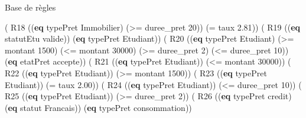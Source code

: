 \documentclass[
  ignorenonframetext,
]{beamer}
\newenvironment{Shaded}{}{}
\newcommand{\DecValTok}[1]{\textcolor[rgb]{0.25,0.63,0.44}{#1}}
\newcommand{\FloatTok}[1]{\textcolor[rgb]{0.25,0.63,0.44}{#1}}
\newcommand{\KeywordTok}[1]{\textcolor[rgb]{0.00,0.44,0.13}{\textbf{#1}}}
\newcommand{\NormalTok}[1]{#1}
\newcommand{\OperatorTok}[1]{\textcolor[rgb]{0.40,0.40,0.40}{#1}}
\begin{document}
\begin{frame}[fragile]{Base de règles}
\protect\hypertarget{base-de-ruxe8gles-2}{}
\begin{Shaded}
\begin{Highlighting}[]
\NormalTok{( R18 ((}\KeywordTok{eq}\NormalTok{ typePret Immobilier) (}\OperatorTok{\textgreater{}=}\NormalTok{ duree\_pret }\DecValTok{20}\NormalTok{)) }
\NormalTok{        (}\OperatorTok{=}\NormalTok{ taux }\FloatTok{2.81}\NormalTok{))}
\NormalTok{( R19 ((}\KeywordTok{eq}\NormalTok{ statutEtu valide)) (}\KeywordTok{eq}\NormalTok{ typePret Etudiant))}
\NormalTok{( R20 ((}\KeywordTok{eq}\NormalTok{ typePret Etudiant) (}\OperatorTok{\textgreater{}=}\NormalTok{ montant }\DecValTok{1500}\NormalTok{) }
\NormalTok{   (}\OperatorTok{\textless{}=}\NormalTok{ montant }\DecValTok{30000}\NormalTok{) (}\OperatorTok{\textgreater{}=}\NormalTok{ duree\_pret }\DecValTok{2}\NormalTok{) (}\OperatorTok{\textless{}=}\NormalTok{ duree\_pret }\DecValTok{10}\NormalTok{)) }
\NormalTok{        (}\KeywordTok{eq}\NormalTok{ etatPret accepte))}
\NormalTok{( R21 ((}\KeywordTok{eq}\NormalTok{ typePret Etudiant)) (}\OperatorTok{\textless{}=}\NormalTok{ montant }\DecValTok{30000}\NormalTok{))}
\NormalTok{( R22 ((}\KeywordTok{eq}\NormalTok{ typePret Etudiant)) (}\OperatorTok{\textgreater{}=}\NormalTok{ montant }\DecValTok{1500}\NormalTok{))}
\NormalTok{( R23 ((}\KeywordTok{eq}\NormalTok{ typePret Etudiant)) (}\OperatorTok{=}\NormalTok{ taux }\FloatTok{2.00}\NormalTok{))}
\NormalTok{( R24 ((}\KeywordTok{eq}\NormalTok{ typePret Etudiant)) (}\OperatorTok{\textless{}=}\NormalTok{ duree\_pret }\DecValTok{10}\NormalTok{))}
\NormalTok{( R25 ((}\KeywordTok{eq}\NormalTok{ typePret Etudiant)) (}\OperatorTok{\textgreater{}=}\NormalTok{ duree\_pret }\DecValTok{2}\NormalTok{))}
\NormalTok{( R26 ((}\KeywordTok{eq}\NormalTok{ typePret credit)(}\KeywordTok{eq}\NormalTok{ statut Francais)) }
\NormalTok{    (}\KeywordTok{eq}\NormalTok{ typePret consommation))}
\end{Highlighting}
\end{Shaded}
\end{frame}
\end{document}
